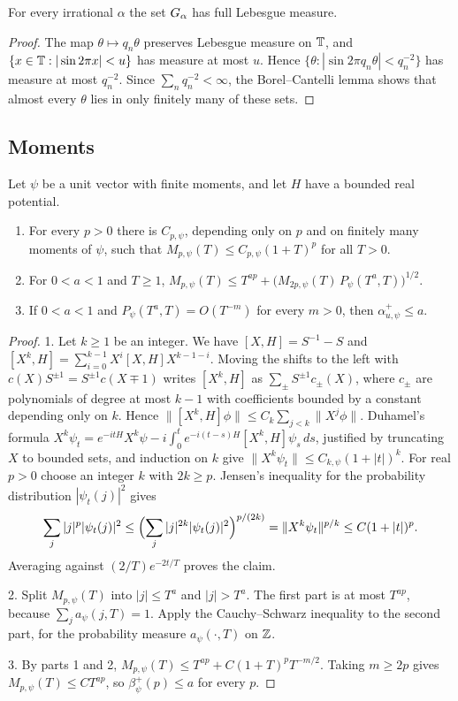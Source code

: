 \begin{lemma}\label{lem:Ga}
For every irrational $\alpha$ the set $G_\alpha$ has full Lebesgue measure.
\end{lemma}

\begin{proof}
The map $\theta\mapsto q_n\theta$ preserves Lebesgue measure on $\mathbb T$, and $\{x\in\mathbb T:|\sin 2\pi x|<u\}$ has measure at most $u$. Hence $\{\theta:|\sin 2\pi q_n\theta|<q_n^{-2}\}$ has measure at most $q_n^{-2}$. Since $\sum_nq_n^{-2}<\infty$, the Borel--Cantelli lemma shows that almost every $\theta$ lies in only finitely many of these sets.
\end{proof}

\subsection{Moments}

\begin{lemma}\label{lem:moments}
Let $\psi$ be a unit vector with finite moments, and let $H$ have a bounded real potential.
\begin{enumerate}
\item For every $p>0$ there is $C_{p,\psi}$, depending only on $p$ and on finitely many moments of $\psi$, such that $M_{p,\psi}(T)\le C_{p,\psi}(1+T)^p$ for all $T>0$.
\item For $0<a<1$ and $T\ge1$, $M_{p,\psi}(T)\le T^{ap}+\bigl(M_{2p,\psi}(T)\,P_\psi(T^a,T)\bigr)^{1/2}$.
\item If $0<a<1$ and $P_\psi(T^a,T)=O(T^{-m})$ for every $m>0$, then $\alpha^+_{u,\psi}\le a$.
\end{enumerate}
\end{lemma}

\begin{proof}
1. Let $k\ge1$ be an integer. We have $[X,H]=S^{-1}-S$ and $[X^k,H]=\sum_{i=0}^{k-1}X^{i}[X,H]X^{k-1-i}$. Moving the shifts to the left with $c(X)S^{\pm1}=S^{\pm1}c(X\mp1)$ writes $[X^k,H]$ as $\sum_{\pm}S^{\pm1}c_\pm(X)$, where $c_\pm$ are polynomials of degree at most $k-1$ with coefficients bounded by a constant depending only on $k$. Hence $\|[X^k,H]\phi\|\le C_k\sum_{j<k}\|X^j\phi\|$. Duhamel's formula $X^k\psi_t=e^{-itH}X^k\psi-i\int_0^te^{-i(t-s)H}[X^k,H]\psi_s\,ds$, justified by truncating $X$ to bounded sets, and induction on $k$ give $\|X^k\psi_t\|\le C_{k,\psi}(1+|t|)^k$. For real $p>0$ choose an integer $k$ with $2k\ge p$. Jensen's inequality for the probability distribution $|\psi_t(j)|^2$ gives
\[
\sum_j|j|^p|\psi_t(j)|^2\le\Bigl(\sum_j|j|^{2k}|\psi_t(j)|^2\Bigr)^{p/(2k)}=\|X^k\psi_t\|^{p/k}\le C(1+|t|)^p.
\]
Averaging against $(2/T)e^{-2t/T}$ proves the claim.

2. Split $M_{p,\psi}(T)$ into $|j|\le T^a$ and $|j|>T^a$. The first part is at most $T^{ap}$, because $\sum_ja_\psi(j,T)=1$. Apply the Cauchy--Schwarz inequality to the second part, for the probability measure $a_\psi(\cdot,T)$ on $\mathbb Z$.

3. By parts 1 and 2, $M_{p,\psi}(T)\le T^{ap}+C(1+T)^{p}T^{-m/2}$. Taking $m\ge2p$ gives $M_{p,\psi}(T)\le CT^{ap}$, so $\beta^+_\psi(p)\le a$ for every $p$.
\end{proof}

